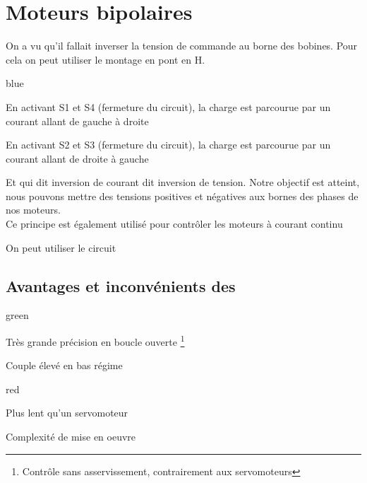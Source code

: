 

\section{Moteurs bipolaires}

On a vu qu'il fallait inverser la tension de commande au borne des bobines. Pour cela on peut utiliser le montage en pont en H.


\begin{items}{blue}{\Bullet}
  \item En activant S1 et S4 (fermeture du circuit), la charge est parcourue par un courant allant de gauche à droite
  \item En activant S2 et S3 (fermeture du circuit), la charge est parcourue par un courant allant de droite à gauche
\end{items}

Et qui dit inversion de courant dit inversion de tension. Notre objectif est atteint, nous pouvons mettre des tensions positives 
et négatives aux bornes des phases de nos moteurs.\\

Ce principe est également utilisé pour contrôler les moteurs à courant continu

On peut utiliser le circuit 


\subsection{Avantages et inconvénients des \paps}

\begin{items}{green}{\Bullet}
    \item Très grande précision en boucle ouverte \footnote{Contrôle sans asservissement, contrairement aux servomoteurs}
    \item Couple élevé en bas régime
\end{items}

\begin{items}{red}{\Bullet}
  \item Plus lent qu'un servomoteur
  \item Complexité de mise en oeuvre
\end{items}


